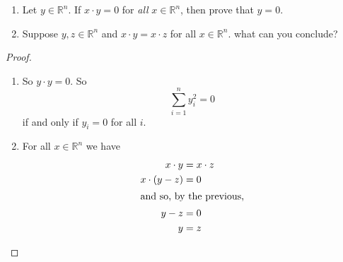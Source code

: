 \begin{exercise} \label{e1.2.15}
    \begin{enumerate}
        \item Let $y \in \mathbb{R}^n$. If $x \cdot y = 0$ for \emph{all} $x \in \mathbb{R}^n$, then prove that $y=0$.
        
        \item Suppose $y,z \in \mathbb{R}^n$ and $x \cdot y = x \cdot z$ for all $x \in \mathbb{R}^n$. what can you conclude?
    \end{enumerate}
    
    \begin{proof}
        \begin{enumerate}
            \item So $y \cdot y=0$. So
            $$ \sum_{i=1}^n y_i^2 = 0 $$
            if and only if $ y_i=0$ for all $i$.
            
            \item For all $x \in \mathbb{R}^n$ we have
            \begin{align*}
                x \cdot y &= x \cdot z \\
                x \cdot (y-z) &= 0 \\
                \intertext{and so, by the previous,}
                y-z &= 0 \\
                y&=z
            \end{align*}
        \end{enumerate}
    \end{proof}
\end{exercise} %

